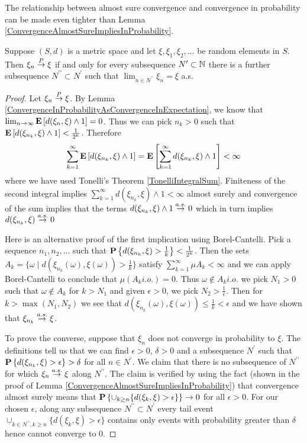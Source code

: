 The relationship between almost sure convergence and convergence in
probability can be made even tighter than Lemma \ref{ConvergenceAlmostSureImpliesInProbability}.  
\begin{lem}\label{ConvergenceInProbabilityAlmostSureSubsequence}Suppose $(S,d)$ is a metric space and let $\xi,
  \xi_1, \xi_2, \dots$ be random elements in $S$.  Then $\xi_n \overset{P}\to
  \xi$ if and only for every subsequence $N^\prime \subset \mathbb{N}$ there is a
  further subsequence $N^{\prime\prime} \subset N^\prime$ such that
  $\lim_{n \in N^{\prime\prime}} \xi_n = \xi$ a.s.
\end{lem}
\begin{proof}
Let $\xi_n \overset{P}\to \xi$.  By Lemma
\ref{ConvergenceInProbabilityAsConvergenceInExpectation}, we know that
$\lim_{n \to \infty} \textbf{E}\left[d(\xi_n, \xi) \wedge 1\right]  = 0$.
Thus we can pick $n_k > 0$ such that $\textbf{E}\left[d(\xi_{n_k}, \xi)
  \wedge 1\right] < \frac{1}{2^k}$.  Therefore  
\begin{align*}\sum_{k=1}^\infty \textbf{E}\left[d(\xi_{n_k}, \xi)
  \wedge 1\right] = \textbf{E}\left[\sum_{k=1}^\infty   d(\xi_{n_k}, \xi)
  \wedge 1\right] < \infty
\end{align*} where we have used Tonelli's Theorem
\ref{TonelliIntegralSum}.  Finiteness of the second integral implies $\sum_{k=1}^\infty   d(\xi_{n_k}, \xi)
  \wedge 1 < \infty$ almost surely and convergence of the sum implies
  that the terms $d(\xi_{n_k}, \xi)  \wedge 1 \overset{a.s.}\to 0$ which in turn
  implies  $d(\xi_{n_k}, \xi)  \overset{a.s.}\to 0$

Here is an alternative proof of the first implication using Borel-Cantelli.  Pick a sequence $n_1,
n_2, \dots$ such that $\textbf{P}\left \{d(\xi_{n_k}, \xi) > \frac{1}{k} \right \} <
\frac{1}{2^k}$.  Then the sets $A_k=\{\omega \mid d(\xi_{n_k}(\omega),
\xi(\omega)) > \frac{1}{k} \}$ satisfy $\sum_{k=1}^\infty \mu A_k <
\infty$ and we can apply Borel-Cantelli to conclude that $\mu (A_k
i.o.) = 0$.  Thus $\omega \notin A_k i.o.$ we pick $N_1 > 0$ such that $\omega \notin A_k$ for $k > N_1$
and given $\epsilon >0$, we pick $N_2 >
\frac{1}{\epsilon}$.  Then for $k > \max(N_1,N_2)$ we see that $d(\xi_{n_k}(\omega),
\xi(\omega)) \leq \frac{1}{k} < \epsilon$ and we have shown that $\xi_{n_k} \overset{a.s.}\to \xi$.

To prove the converse, suppose that $\xi_n$ does not converge in
probability to $\xi$.  The definitions tell us that we can find
$\epsilon > 0$, $\delta > 0$ and a subsequence $N^\prime$ such that
$\textbf{P}\left \{d(\xi_{n_k}, \xi) > \epsilon \right \} > \delta$ for all $n \in
N^\prime$.  We claim that there is no subsequence of $N^{\prime
  \prime}$ for which $\xi_n \overset{a.s.}\to \xi$ along $N^{\prime \prime}$.  The
claim is verified by using the fact (shown in the proof of Lemma
\ref{ConvergenceAlmostSureImpliesInProbability}) that convergence
almost surely means that $\textbf{P}\left \{\cup_{k\geq n} \lbrace d(\xi_k,
  \xi) > \epsilon \rbrace \right \} \to 0$ for all $\epsilon > 0$.  For our
chosen $\epsilon$, along any
subsequence $N^{\prime \prime} \subset N^{\prime}$ every tail event
$\cup_{k \in N^{\prime \prime}, k\geq n} \lbrace d(\xi_k,
  \xi) > \epsilon \rbrace$ contains only events with probability greater
  than $\delta$ hence cannot converge to $0$.
\end{proof}


